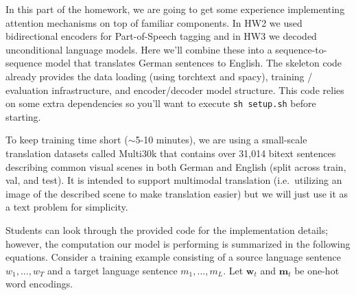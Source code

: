 \documentclass[a4paper,10pt]{article}
\begin{document}
In this part of the homework, we are going to get some experience implementing attention mechanisms on top of familiar components. In HW2 we used bidirectional encoders for Part-of-Speech tagging and in HW3 we decoded unconditional language models. Here we'll combine these into a sequence-to-sequence model that translates German sentences to English. The skeleton code already provides the data loading (using torchtext and spacy), training / evaluation infrastructure,  and encoder/decoder model structure. This code relies on some extra dependencies so you'll want to execute \texttt{sh setup.sh} before starting.

To keep training time short ($\sim$5-10 minutes), we are using a small-scale translation datasets called Multi30k \cite{elliott2016multi30k} that contains over 31,014 bitext sentences describing common visual scenes in both German and English (split across train, val, and test). It is intended to support multimodal translation (i.e.~utilizing an image of the described scene to make translation easier) but we will just use it as a text problem for simplicity. 



\renewcommand{\overrightarrow}{\overset{\rightharpoonup}}
\renewcommand{\overleftarrow}{\overset{\mathbf{\leftharpoonup}}}

Students can look through the provided code for the implementation details; however, the computation our model is performing is summarized in the following equations. Consider a training example consisting of a source language sentence $w_1, ..., w_T$ and a target language sentence $m_1, ..., m_L$. Let $\mathbf{w}_{t}$ and $\mathbf{m}_t$ be one-hot word encodings.\\
\end{document}
